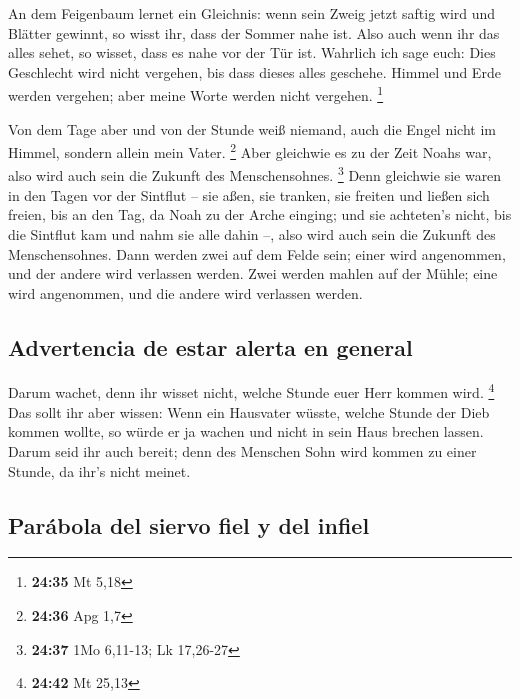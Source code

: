  An dem Feigenbaum lernet ein Gleichnis: wenn sein Zweig
jetzt saftig wird und Blätter gewinnt, so wisst ihr, dass der Sommer
nahe ist.  Also auch wenn ihr das alles sehet, so wisset,
dass es nahe vor der Tür ist.  Wahrlich ich sage euch:
Dies Geschlecht wird nicht vergehen, bis dass dieses alles geschehe.
 Himmel und Erde werden vergehen; aber meine Worte werden
nicht vergehen. \footnote{\textbf{24:35} Mt 5,18}

 Von dem Tage aber und von der Stunde weiß niemand, auch
die Engel nicht im Himmel, sondern allein mein Vater. \footnote{\textbf{24:36}
  Apg 1,7}  Aber gleichwie es zu der Zeit Noahs war, also
wird auch sein die Zukunft des Menschensohnes. \footnote{\textbf{24:37}
  1Mo 6,11-13; Lk 17,26-27}  Denn gleichwie sie waren in
den Tagen vor der Sintflut -- sie aßen, sie tranken, sie freiten und
ließen sich freien, bis an den Tag, da Noah zu der Arche einging;
 und sie achteten's nicht, bis die Sintflut kam und nahm
sie alle dahin --, also wird auch sein die Zukunft des Menschensohnes.
 Dann werden zwei auf dem Felde sein; einer wird
angenommen, und der andere wird verlassen werden.  Zwei
werden mahlen auf der Mühle; eine wird angenommen, und die andere wird
verlassen werden.

\hypertarget{advertencia-de-estar-alerta-en-general}{%
\subsection{Advertencia de estar alerta en
general}\label{advertencia-de-estar-alerta-en-general}}

 Darum wachet, denn ihr wisset nicht, welche Stunde euer
Herr kommen wird. \footnote{\textbf{24:42} Mt 25,13}  Das
sollt ihr aber wissen: Wenn ein Hausvater wüsste, welche Stunde der Dieb
kommen wollte, so würde er ja wachen und nicht in sein Haus brechen
lassen.  Darum seid ihr auch bereit; denn des Menschen
Sohn wird kommen zu einer Stunde, da ihr's nicht meinet.

\hypertarget{paruxe1bola-del-siervo-fiel-y-del-infiel}{%
\subsection{Parábola del siervo fiel y del
infiel}\label{paruxe1bola-del-siervo-fiel-y-del-infiel}}

